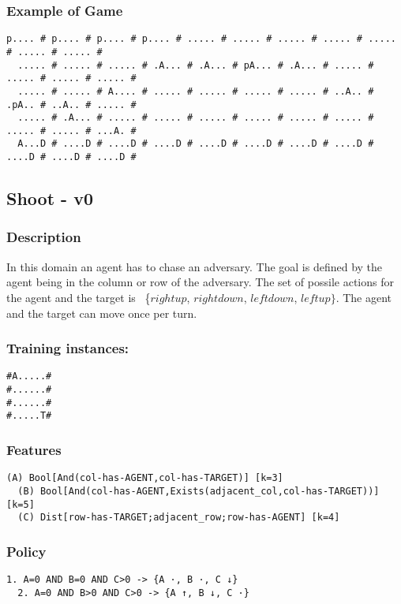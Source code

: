 \documentclass[a4paper]{article}
\begin{document}
\subsubsection{Example of Game}
\begin{Verbatim}[fontsize=\footnotesize]
  p.... # p.... # p.... # p.... # ..... # ..... # ..... # ..... # ..... # ..... # ..... #
  ..... # ..... # ..... # .A... # .A... # pA... # .A... # ..... # ..... # ..... # ..... #
  ..... # ..... # A.... # ..... # ..... # ..... # ..... # ..A.. # .pA.. # ..A.. # ..... #
  ..... # .A... # ..... # ..... # ..... # ..... # ..... # ..... # ..... # ..... # ...A. #
  A...D # ....D # ....D # ....D # ....D # ....D # ....D # ....D # ....D # ....D # ....D #
\end{Verbatim}

\subsection{Shoot - v0}
\subsubsection{Description}
In this domain an agent has to chase an adversary. The goal is defined by the agent being in the column or row of the adversary. The set of possile actions for the agent and the target is ~\{$rightup$, $rightdown$, $leftdown$, $leftup\}$.  The agent and the target can move once per turn.

\subsubsection{Training instances:}
\begin{Verbatim}[fontsize=\footnotesize]
#A.....#
#......#
#......#
#.....T#
\end{Verbatim}

\subsubsection{Features}
\begin{Verbatim}[fontsize=\footnotesize]
  (A) Bool[And(col-has-AGENT,col-has-TARGET)] [k=3]
  (B) Bool[And(col-has-AGENT,Exists(adjacent_col,col-has-TARGET))] [k=5]
  (C) Dist[row-has-TARGET;adjacent_row;row-has-AGENT] [k=4]

\end{Verbatim}

\subsubsection{Policy}
\begin{Verbatim}[fontsize=\footnotesize]
  1. A=0 AND B=0 AND C>0 -> {A ·, B ·, C ↓}
  2. A=0 AND B>0 AND C>0 -> {A ↑, B ↓, C ·}
\end{Verbatim}
\end{document}
